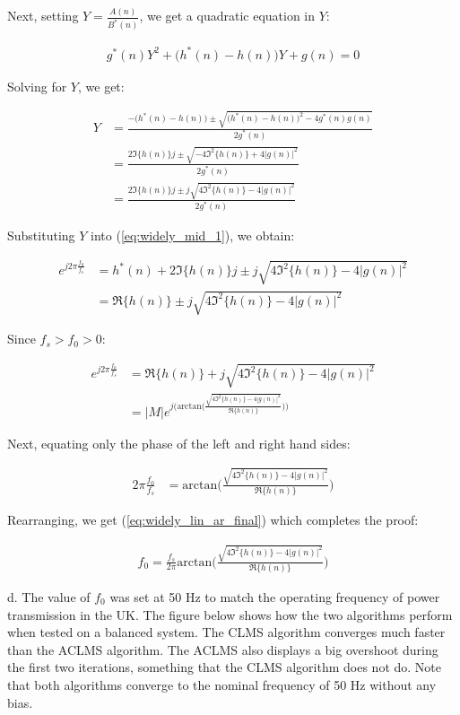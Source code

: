 \noindent{}Next, setting $Y=\frac{A(n)}{B^*(n)}$, we get a quadratic equation in $Y$:

\begin{align*}
g^*(n)Y^2 + \big(h^*(n)-h(n)\big)Y + g(n) = 0
\end{align*}

\noindent{}Solving for $Y$, we get:

\begin{align*}
Y &= \frac{-\big(h^*(n)-h(n)\big) \pm \sqrt{\big(h^*(n)-h(n)\big)^2-4g^*(n)g(n)}}{2g^*(n)} \\
&= \frac{2\Im\{h(n)\}j \pm \sqrt{-4\Im^2\{h(n)\}+4|g(n)|^2}}{2g^*(n)} \\
&= \frac{2\Im\{h(n)\}j \pm j\sqrt{4\Im^2\{h(n)\}-4|g(n)|^2}}{2g^*(n)}
\end{align*}

\noindent{}Substituting $Y$ into (\ref{eq:widely_mid_1}), we obtain:

\begin{align*}
e^{j2\pi\frac{f_0}{f_s}} &= h^*(n) + 2\Im\{h(n)\}j \pm j\sqrt{4\Im^2\{h(n)\}-4|g(n)|^2} \\
&= \Re\{h(n)\} \pm j\sqrt{4\Im^2\{h(n)\}-4|g(n)|^2}
\end{align*}

\noindent{}Since $f_s > f_0 > 0$:

\begin{align*}
e^{j2\pi\frac{f_0}{f_s}}  &= \Re\{h(n)\} + j\sqrt{4\Im^2\{h(n)\}-4|g(n)|^2} \\
&= |M| e^{j\big(\text{arctan}\big(\frac{\sqrt{4\Im^2\{h(n)\}-4|g(n)|^2}}{\Re\{h(n)\}}\big)\big)}
\end{align*}

\noindent{}Next, equating only the phase of the left and right hand sides:

\begin{align*}
2\pi\frac{f_0}{f_s}  &= \text{arctan}\bigg(\frac{\sqrt{4\Im^2\{h(n)\}-4|g(n)|^2}}{\Re\{h(n)\}}\bigg)
\end{align*}

\noindent{}Rearranging, we get (\ref{eq:widely_lin_ar_final}) which completes the proof:

\begin{align}
f_0 = \frac{f_s}{2\pi} \text{arctan}\bigg(\frac{\sqrt{4\Im^2\{h(n)\}-4|g(n)|^2}}{\Re\{h(n)\}}\bigg) \label{eq:widely_lin_ar_final}
\end{align}

\noindent{}d. The value of $f_0$ was set at 50 Hz to match the operating frequency of power transmission in the UK. The figure below shows how the two algorithms perform when tested on a balanced system. The CLMS algorithm converges much faster than the ACLMS algorithm. The ACLMS also displays a big overshoot during the first two iterations, something that the CLMS algorithm does not do. Note that both algorithms converge to the nominal frequency of 50 Hz without any bias.

